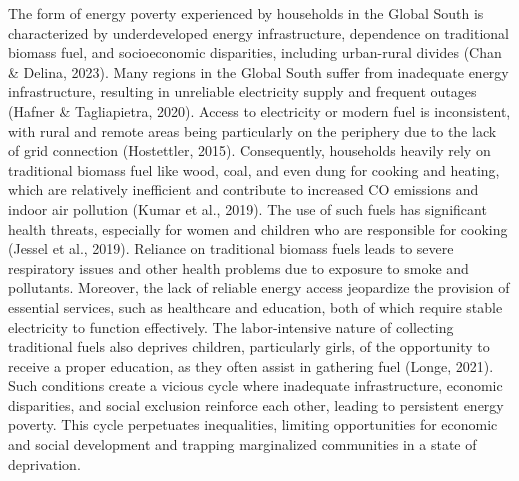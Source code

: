 \documentclass[
  twoside,
  openright,
  degree    = master,               %
  language  = english,              %
  fontset   = overleaf,             %
  watermark = true,                 %
  doi       = true,                 %
]{ntuthesis}
\begin{document}
The form of energy poverty experienced by households in the Global South
is characterized by underdeveloped energy infrastructure, dependence on
traditional biomass fuel, and socioeconomic disparities, including
urban-rural divides (Chan \& Delina, 2023). Many regions in the Global
South suffer from inadequate energy infrastructure, resulting in
unreliable electricity supply and frequent outages (Hafner \&
Tagliapietra, 2020). Access to electricity or modern fuel is
inconsistent, with rural and remote areas being particularly on the
periphery due to the lack of grid connection (Hostettler, 2015).
Consequently, households heavily rely on traditional biomass fuel like
wood, coal, and even dung for cooking and heating, which are relatively
inefficient and contribute to increased CO emissions and indoor air
pollution (Kumar et al., 2019). The use of such fuels has significant
health threats, especially for women and children who are responsible
for cooking (Jessel et al., 2019). Reliance on traditional biomass fuels
leads to severe respiratory issues and other health problems due to
exposure to smoke and pollutants. Moreover, the lack of reliable energy
access jeopardize the provision of essential services, such as
healthcare and education, both of which require stable electricity to
function effectively. The labor-intensive nature of collecting
traditional fuels also deprives children, particularly girls, of the
opportunity to receive a proper education, as they often assist in
gathering fuel (Longe, 2021). Such conditions create a vicious cycle
where inadequate infrastructure, economic disparities, and social
exclusion reinforce each other, leading to persistent energy poverty.
This cycle perpetuates inequalities, limiting opportunities for economic
and social development and trapping marginalized communities in a state
of deprivation.
\end{document}
